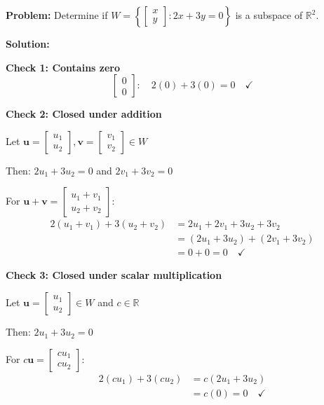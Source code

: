 \documentclass[12pt,a4paper]{article}
\theoremstyle{definition}
\begin{document}
\textbf{Problem:} Determine if $W = \left\{\begin{bmatrix} x \\ y \end{bmatrix} : 2x + 3y = 0\right\}$ is a subspace of $\mathbb{R}^2$.

\textbf{Solution:}

\textbf{Check 1: Contains zero}
\begin{equation}
\begin{bmatrix} 0 \\ 0 \end{bmatrix}: \quad 2(0) + 3(0) = 0 \quad ✓
\end{equation}

\textbf{Check 2: Closed under addition}

Let $\mathbf{u} = \begin{bmatrix} u_1 \\ u_2 \end{bmatrix}, \mathbf{v} = \begin{bmatrix} v_1 \\ v_2 \end{bmatrix} \in W$

Then: $2u_1 + 3u_2 = 0$ and $2v_1 + 3v_2 = 0$

For $\mathbf{u} + \mathbf{v} = \begin{bmatrix} u_1 + v_1 \\ u_2 + v_2 \end{bmatrix}$:
\begin{align}
2(u_1 + v_1) + 3(u_2 + v_2) &= 2u_1 + 2v_1 + 3u_2 + 3v_2 \\
&= (2u_1 + 3u_2) + (2v_1 + 3v_2) \\
&= 0 + 0 = 0 \quad ✓
\end{align}

\textbf{Check 3: Closed under scalar multiplication}

Let $\mathbf{u} = \begin{bmatrix} u_1 \\ u_2 \end{bmatrix} \in W$ and $c \in \mathbb{R}$

Then: $2u_1 + 3u_2 = 0$

For $c\mathbf{u} = \begin{bmatrix} cu_1 \\ cu_2 \end{bmatrix}$:
\begin{align}
2(cu_1) + 3(cu_2) &= c(2u_1 + 3u_2) \\
&= c(0) = 0 \quad ✓
\end{align}
\end{document}
